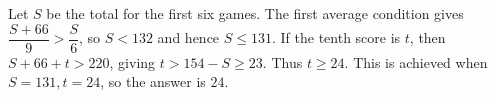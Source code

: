 Let $S$ be the total for the first six games. The first average condition gives $\dfrac{S+66}{9}>\dfrac{S}{6}$, so $S<132$ and hence $S\le131$. If the tenth score is $t$, then $S+66+t>220$, giving $t>154-S\ge23$. Thus $t\ge24$. This is achieved when $S=131,t=24$, so the answer is $\boxed{24}$.

